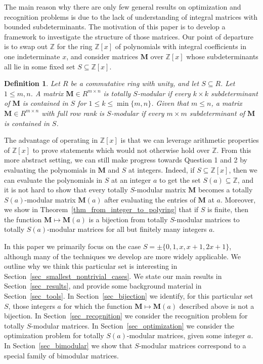 \documentclass[a4paper, 11pt]{article}
\newcommand{\Z}{\mathbb{Z}}
\newcommand{\bM}{\bm{M}}
\newcommand{\indet}{x}
\newcommand{\intvar}{a}
\newcommand{\polyring}{\Z[\indet]}
\newcommand{\polyS}{S}
\newcommand{\polyM}{\bM}
\newtheorem{definition}{Definition}
\begin{document}
	The main reason why there are only few general results on optimization and recognition problems is due to the lack of understanding of integral matrices with bounded subdeterminants. 
	The motivation of this paper is to develop a framework to investigate the structure of those matrices. Our point of departure is to swap out $\Z$ for the ring $\polyring$ of polynomials with integral coefficients in one indeterminate $\indet$, and consider matrices $\polyM$ over $\polyring$ whose subdeterminants all lie in some fixed set $\polyS\subseteq\polyring$. 
	\begin{definition}
		\label{def_tot_S_mod_forbidden_submatrix}
		Let $R$ be a commutative ring with unity, and let $\polyS\subseteq R$. Let $1\leq m,n$. A matrix $\polyM\in R^{m\times n}$ is \emph{totally $\polyS$-modular} if every $k\times k$ subdeterminant of $\polyM$ is contained in $\polyS$ for $1\leq k\leq \min \lbrace m,n\rbrace$. Given that $m\leq n$, a matrix $\polyM\in R^{m\times n}$ with full row rank is \emph{$\polyS$-modular} if every $m\times m$ subdeterminant of $\polyM$ is contained in $\polyS$.
	\end{definition}

The advantage of operating in $\polyring$ is that we can leverage arithmetic properties of $\polyring$ to prove statements which would not otherwise hold over $\Z$. From this more abstract setting, we can still make progress towards Question 1 and 2 by evaluating the polynomials in $\polyM$ and $\polyS$ at integers. Indeed, if $\polyS\subseteq \polyring$, then we can evaluate the polynomials in $\polyS$ at an integer $\intvar$ to get the set $\polyS(a)\subseteq\Z$, and it is not hard to show that every totally $\polyS$-modular matrix $\polyM$ becomes a totally $\polyS(\intvar)$-modular matrix $\polyM(\intvar)$ after evaluating the entries of $\polyM$ at $\intvar$. Moreover, we show in Theorem~\ref{thm_from_integer_to_polyring} that if $\polyS$ is finite, then the function $\polyM\mapsto\polyM(\intvar)$ is a bijection from totally $\polyS$-modular matrices to totally $\polyS(\intvar)$-modular matrices for all but finitely many integers $\intvar$.

In this paper we primarily focus on the case $S=\pm\{0,1,x,x+1,2x+1\}$, although many of the techniques we develop are more widely applicable. We outline why we think this particular set is interesting in Section~\ref{sec_smallest_nontrivial_cases}. We state our main results in Section~\ref{sec_results}, and provide some background material in Section~\ref{sec_tools}. In Section~\ref{sec_bijection} we identify, for this particular set $\polyS$, those integers $\intvar$ for which the function $\polyM\mapsto\polyM(\intvar)$ described above is not a bijection. In Section~\ref{sec_recognition} we consider the recognition problem for totally $\polyS$-modular matrices. In Section~\ref{sec_optimization} we consider the optimization problem for totally $\polyS(\intvar)$-modular matrices, given some integer $\intvar$. In Section~\ref{sec_bimodular} we show that $\polyS$-modular matrices correspond to a special family of bimodular matrices.
	
\end{document}
